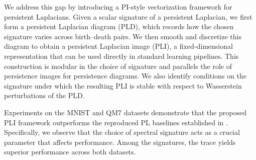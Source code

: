\documentclass{article}
\begin{document}

We address this gap by introducing a PI-style vectorization framework for persistent Laplacians. Given a scalar signature of a persistent Laplacian, we first form a persistent Laplacian diagram (PLD), which records how the chosen signature varies across birth--death pairs. We then smooth and discretize this diagram to obtain a persistent Laplacian image (PLI), a fixed-dimensional representation that can be used directly in standard learning pipelines. This construction is modular in the choice of signature and parallels the role of persistence images for persistence diagrams. We also identify conditions on the signature under which the resulting PLI is stable with respect to Wasserstein perturbations of the PLD.

Experiments on the MNIST and QM7 datasets demonstrate that the proposed PLI framework outperforms the reproduced PL baselines established in \cite{davies2023persistent}. Specifically, we observe that the choice of spectral signature acts as a crucial parameter that affects performance. Among the signatures, the trace yields superior performance across both datasets.
\end{document}
